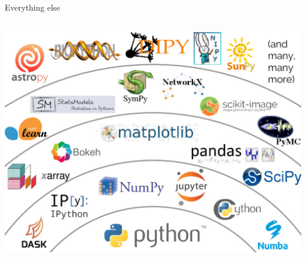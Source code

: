 \documentclass[aspectratio=169]{beamer}
\begin{document}
\begin{frame}{Everything else}
\vspace{0.16 cm}
\begin{columns}
\vspace{-4 cm}
\includegraphics[width=\linewidth]{shells-5.png}
\end{columns}
\end{frame}
\end{document}
